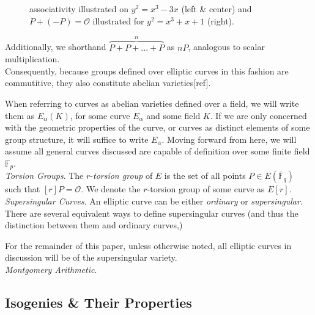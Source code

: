 \begin{figure}[!h]
\caption{associativity illustrated on $y^2 = x^3 - 3x$ (left \& center) and $P + (-P) = \mathcal{O}$ illustrated for $y^2 = x^3 + x + 1$ (right).}
\label{fig:groupop}
\end{figure}

Additionally, we shorthand $\overbrace{P + P + ... + P}^{n}$ as $nP$, analogous to scalar multiplication.\\

Consequently, because groups defined over elliptic curves in this fashion are commutitive, they also constitute abelian varieties[ref].

When referring to curves as abelian varieties defined over a field, we will write them as $E_{\alpha}(K)$, for some curve $E_{\alpha}$ and some field $K$. If we are only concerned with the geometric properties of the curve, or curves as distinct elements of some group structure, it will suffice to write $E_{\alpha}$. Moving forward from here, we will assume all general curves discussed are capable of definition over some finite field $\mathbb{F}_p$.\\

\noindent
\emph{Torsion Groups}. The $r$-\emph{torsion group} of $E$ is the set of all points $P \in E(\overline{\mathbb{F}}_q)$ such that $[r]P = \mathcal{O}$. We denote the $r$-torsion group of some curve as $E[r]$.\\

\noindent
\emph{Supersingular Curves}. An elliptic curve can be either \emph{ordinary} or \emph{supersingular}. There are several equivalent ways to define supersingular curves (and thus the distinction between them and ordinary curves,)

For the remainder of this paper, unless otherwise noted, all elliptic curves in discussion will be of the supersingular variety.\\

\noindent
\emph{Montgomery Arithmetic}.

\subsection{Isogenies \& Their Properties}

